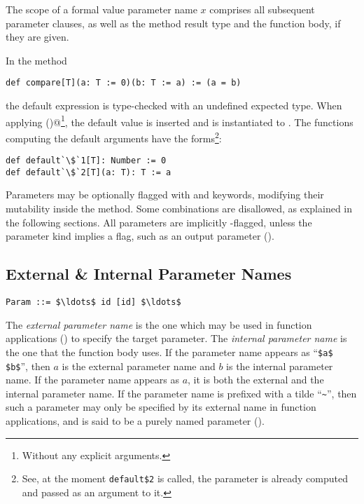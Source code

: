 The scope of a formal value parameter name $x$ comprises all subsequent parameter clauses, as well as the method result type and the function body, if they are given.

\example In the method
\begin{lstlisting}
def compare[T](a: T := 0)(b: T := a) := (a = b)
\end{lstlisting}
the default expression  is type-checked with an undefined expected type. When applying \lstinline@compare()@\footnote{Without any explicit arguments.}, the default value  is inserted and  is instantiated to . The functions computing the default arguments have the forms\footnote{See, at the moment \lstinline[mathescape=false]!default$2! is called, the parameter  is already computed and passed as an argument to it.}:
\begin{lstlisting}[escapechar=`]
def default`\$`1[T]: Number := 0
def default`\$`2[T](a: T): T := a
\end{lstlisting}

Parameters may be optionally flagged with  and  keywords, modifying their mutability inside the method. Some combinations are disallowed, as explained in the following sections. All parameters are implicitly -flagged, unless the parameter kind implies a  flag, such as an output parameter ().





\subsection{External \& Internal Parameter Names}
\label{sec:external-internal-parameter-names}

\syntax\begin{lstlisting}
Param ::= $\ldots$ id [id] $\ldots$
\end{lstlisting}

The {\em external parameter name} is the one which may be used in function applications () to specify the target parameter. The {\em internal parameter name} is the one that the function body uses. If the parameter name appears as ``\lstinline!$a$ $b$!'', then $a$ is the external parameter name and $b$ is the internal parameter name. If the parameter name appears as $a$, it is both the external and the internal parameter name. If the parameter name is prefixed with a tilde ``\lstinline!~!'', then such a parameter may only be specified by its external name in function applications, and is said to be a purely named parameter (). 

